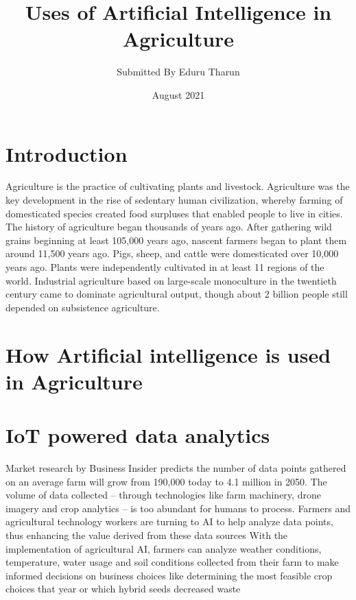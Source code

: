 \documentclass{article}
\title{Uses of Artificial Intelligence in Agriculture}
\author{Submitted By Eduru Tharun}
\date{August 2021}
\begin{document}
\maketitle

\section{Introduction}
Agriculture is the practice of cultivating plants and livestock. Agriculture was the key development in the rise of sedentary human civilization, whereby farming of domesticated species created food surpluses that enabled people to live in cities. The history of agriculture began thousands of years ago. After gathering wild grains beginning at least 105,000 years ago, nascent farmers began to plant them around 11,500 years ago. Pigs, sheep, and cattle were domesticated over 10,000 years ago. Plants were independently cultivated in at least 11 regions of the world. Industrial agriculture based on large-scale monoculture in the twentieth century came to dominate agricultural output, though about 2 billion people still depended on subsistence agriculture.

\section{How Artificial intelligence is used  in Agriculture}
\section{IoT powered data analytics}
Market research by Business Insider predicts the number of data points gathered on an average farm will grow from 190,000 today to 4.1 million in 2050. The volume of data collected – through technologies like farm machinery, drone imagery and crop analytics – is too abundant for humans to process. Farmers and agricultural technology workers are turning to AI to help analyze data points, thus enhancing the value derived from these data sources With the implementation of agricultural AI, farmers can analyze weather conditions, temperature, water usage and soil conditions collected from their farm to make informed decisions on business choices  like determining the most feasible crop choices that year or which hybrid seeds decreased waste
\end{document}
